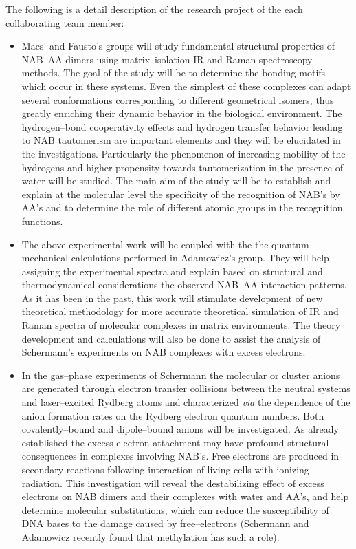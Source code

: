 \noindent
The following is a detail description of the research
project of the each collaborating team member:

\begin{itemize}

\item
Maes' and Fausto's groups will study fundamental 
structural properties of NAB--AA dimers using matrix--isolation IR and
Raman spectroscopy methods.
The goal of the study will be to determine the
bonding motifs which occur in these systems.
Even the simplest of these complexes can adapt
several conformations corresponding to different geometrical
isomers, thus greatly enriching their dynamic behavior in
the biological environment. 
The hydrogen--bond cooperativity effects
and hydrogen transfer behavior
leading to NAB tautomerism are important elements and
they will be elucidated in the investigations. 
Particularly the phenomenon of increasing mobility of the hydrogens
and higher propensity towards tautomerization
in the presence of water will be
studied.
The main aim of the study will be to establish
and explain at the molecular level
the specificity
of the recognition of NAB's by AA's
and to determine the role of different atomic groups
in the recognition functions.


\item
The above experimental work will be coupled with the
the quantum--mechanical calculations performed in
Adamowicz's group. They will help assigning the 
experimental spectra and explain based on structural
and thermodynamical considerations the observed 
NAB--AA interaction patterns.
As it has been in the past, this work will
stimulate development
of new theoretical methodology
for more accurate theoretical simulation of IR and
Raman spectra
of molecular complexes in matrix environments.
The theory development and 
calculations will also be done to assist the
analysis of Schermann's experiments on NAB complexes
with excess electrons.


\item
In the gas--phase experiments of Schermann 
the molecular or cluster anions are generated
through electron transfer collisions between the neutral
systems and laser--excited Rydberg atoms and
characterized {\it via} the dependence of the
anion formation rates on the Rydberg electron quantum numbers.
Both covalently--bound and dipole--bound anions will be
investigated.
As already established the
excess electron attachment may have profound 
structural consequences in complexes involving NAB's.
Free electrons are produced in secondary reactions
following interaction of living cells with ionizing
radiation. This investigation will reveal the
destabilizing effect of excess electrons on NAB dimers and
their complexes with water and AA's, 
and help determine molecular substitutions,
which can reduce
the susceptibility of DNA bases to the damage caused
by free--electrons (Schermann and Adamowicz recently
found that methylation has such a role).





\end{itemize}
